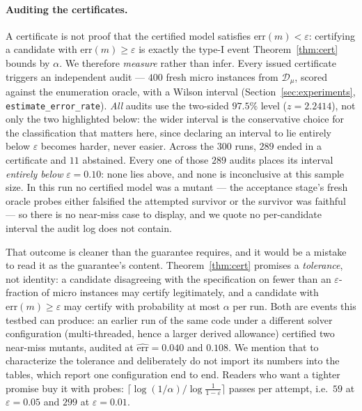 \documentclass[pdflatex,sn-mathphys-num]{sn-jnl}
\theoremstyle{thmstyleone}
\theoremstyle{thmstyletwo}
\begin{document}
\paragraph{Auditing the certificates.}\label{sec:audit}
A certificate is not proof that the certified model satisfies
$\mathrm{err}(m) < \varepsilon$: certifying a candidate with
$\mathrm{err}(m) \ge \varepsilon$ is exactly the type-I event
Theorem~\ref{thm:cert} bounds by $\alpha$. We therefore \emph{measure}
rather than infer. Every issued certificate triggers an independent
audit --- $400$ fresh micro instances from $\mathcal{D}_{\mu}$,
scored against the enumeration oracle, with a Wilson interval
(Section~\ref{sec:experiments}, \texttt{estimate\_error\_rate}).
\emph{All} audits use the two-sided $97.5\%$ level ($z = 2.2414$),
not only the two highlighted below: the wider interval is the
conservative choice for the classification that matters here, since
declaring an interval to lie entirely below $\varepsilon$ becomes
harder, never easier.
Across the $300$ runs, $289$ ended in a certificate and $11$
abstained. Every one of those $289$ audits places its interval
\emph{entirely below} $\varepsilon = 0.10$: none lies above, and none
is inconclusive at this sample size. In this run no certified model
was a mutant --- the acceptance stage's fresh oracle probes either
falsified the attempted survivor or the survivor was faithful --- so
there is no near-miss case to display, and we quote no per-candidate
interval the audit log does not contain.

That outcome is cleaner than the guarantee requires, and it would be a
mistake to read it as the guarantee's content.
Theorem~\ref{thm:cert} promises a \emph{tolerance}, not identity: a
candidate disagreeing with the specification on fewer than an
$\varepsilon$-fraction of micro instances may certify legitimately,
and a candidate with $\mathrm{err}(m) \ge \varepsilon$ may certify
with probability at most $\alpha$ per run. Both are events this
testbed can produce: an earlier run of the same code under a different
solver configuration (multi-threaded, hence a larger derived
allowance) certified two near-miss mutants, audited at
$\widehat{\mathrm{err}} = 0.040$ and $0.108$. We mention that to
characterize the tolerance and deliberately do not import its numbers
into the tables, which report one configuration end to end. Readers
who want a tighter promise buy it with probes:
$\lceil\log(1/\alpha)/\log\frac{1}{1-\varepsilon}\rceil$ passes per
attempt, i.e.\ $59$ at $\varepsilon = 0.05$ and $299$ at
$\varepsilon = 0.01$.
\end{document}
